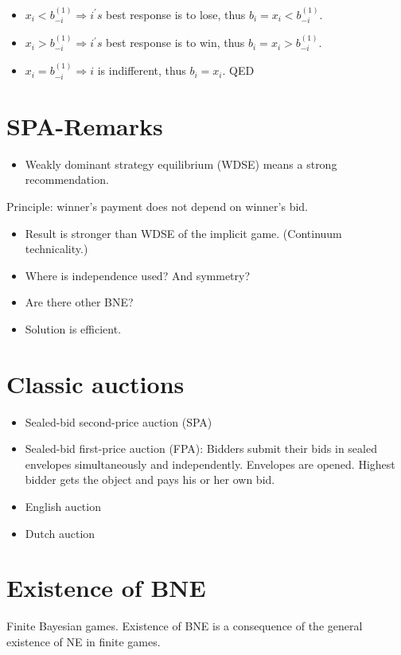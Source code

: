 \documentclass[10pt]{article}
\begin{document}
\begin{itemize}
  \item $x_{i}<b_{-i}^{(1)} \Longrightarrow i^{\prime} s$ best response is to lose, thus $b_{i}=x_{i}<b_{-i}^{(1)}$.
  \item $x_{i}>b_{-i}^{(1)} \Longrightarrow i^{\prime} s$ best response is to win, thus $b_{i}=x_{i}>b_{-i}^{(1)}$.
  \item $x_{i}=b_{-i}^{(1)} \Longrightarrow i$ is indifferent, thus $b_{i}=x_{i}$. QED
\end{itemize}

\section*{SPA-Remarks}
\begin{itemize}
  \item Weakly dominant strategy equilibrium (WDSE) means a strong recommendation.
\end{itemize}

Principle: winner's payment does not depend on winner's bid.

\begin{itemize}
  \item Result is stronger than WDSE of the implicit game. (Continuum technicality.)
  \item Where is independence used? And symmetry?
  \item Are there other BNE?
  \item Solution is efficient.
\end{itemize}

\section*{Classic auctions}
\begin{itemize}
  \item Sealed-bid second-price auction (SPA)
  \item Sealed-bid first-price auction (FPA): Bidders submit their bids in sealed envelopes simultaneously and independently. Envelopes are opened. Highest bidder gets the object and pays his or her own bid.
  \item English auction
  \item Dutch auction
\end{itemize}

\section*{Existence of BNE}
Finite Bayesian games. Existence of BNE is a consequence of the general existence of NE in finite games.
\end{document}
